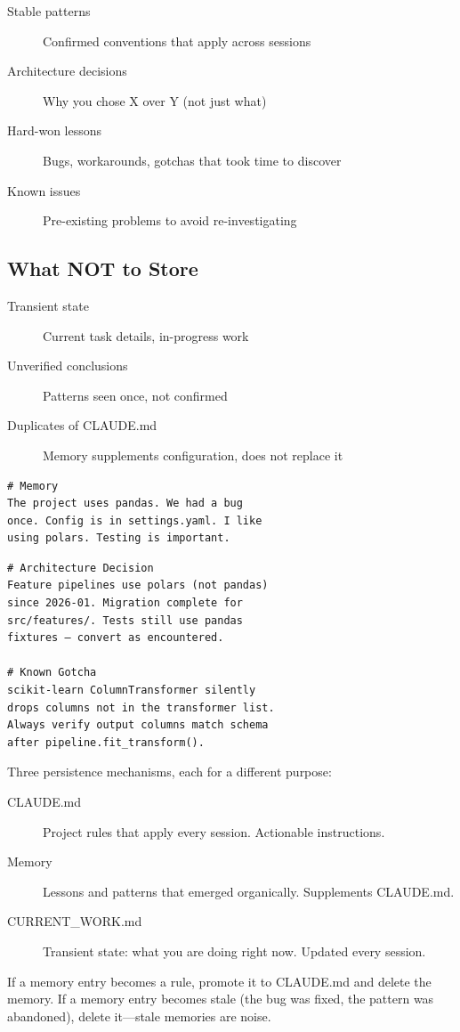 \begin{description}
  \item[Stable patterns] Confirmed conventions that apply across sessions
  \item[Architecture decisions] Why you chose X over Y (not just what)
  \item[Hard-won lessons] Bugs, workarounds, gotchas that took time to discover
  \item[Known issues] Pre-existing problems to avoid re-investigating
\end{description}

\subsection{What NOT to Store}

\begin{description}
  \item[Transient state] Current task details, in-progress work
  \item[Unverified conclusions] Patterns seen once, not confirmed
  \item[Duplicates of CLAUDE.md] Memory supplements configuration, does not replace it
\end{description}

\begin{fullwidth}
\begin{beforeafter}
\before
\begin{verbatim}
# Memory
The project uses pandas. We had a bug
once. Config is in settings.yaml. I like
using polars. Testing is important.
\end{verbatim}

\after
\begin{verbatim}
# Architecture Decision
Feature pipelines use polars (not pandas)
since 2026-01. Migration complete for
src/features/. Tests still use pandas
fixtures — convert as encountered.

# Known Gotcha
scikit-learn ColumnTransformer silently
drops columns not in the transformer list.
Always verify output columns match schema
after pipeline.fit_transform().
\end{verbatim}
\end{beforeafter}
\end{fullwidth}

\begin{tipbox}
Three persistence mechanisms, each for a different purpose:
\begin{description}
  \item[CLAUDE.md] Project rules that apply every session. Actionable instructions.
  \item[Memory] Lessons and patterns that emerged organically. Supplements CLAUDE.md.
  \item[CURRENT\_WORK.md] Transient state: what you are doing right now. Updated every session.
\end{description}
If a memory entry becomes a rule, promote it to CLAUDE.md and delete the memory.
If a memory entry becomes stale (the bug was fixed, the pattern was abandoned),
delete it---stale memories are noise.
\end{tipbox}

